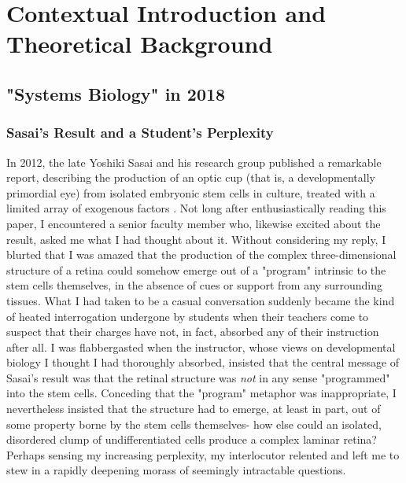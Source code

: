 \chapter{Contextual Introduction and Theoretical Background}
\section{"Systems Biology" in 2018}
\subsection{Sasai's Result and a Student's Perplexity}

In 2012, the late Yoshiki Sasai and his research group published a remarkable report, describing the production of an optic cup (that is, a developmentally primordial eye) from isolated embryonic stem cells in culture, treated with a limited array of exogenous factors \cite{Nakano2012}. Not long after enthusiastically reading this paper, I encountered a senior faculty member who, likewise excited about the result, asked me what I had thought about it. Without considering my reply, I blurted that I was amazed that the production of the complex three-dimensional structure of a retina could somehow emerge out of a "program" intrinsic to the stem cells themselves, in the absence of cues or support from any surrounding tissues. What I had taken to be a casual conversation suddenly became the kind of heated interrogation undergone by students when their teachers come to suspect that their charges have not, in fact, absorbed any of their instruction after all. I was flabbergasted when the instructor, whose views on developmental biology I thought I had thoroughly absorbed, insisted that the central message of Sasai's result was that the retinal structure was \textit{not} in any sense "programmed" into the stem cells. Conceding that the "program" metaphor was inappropriate, I nevertheless insisted that the structure had to emerge, at least in part, out of some property borne by the stem cells themselves- how else could an isolated, disordered clump of undifferentiated cells produce a complex laminar retina? Perhaps sensing my increasing perplexity, my interlocutor relented and left me to stew in a rapidly deepening morass of seemingly intractable questions.

